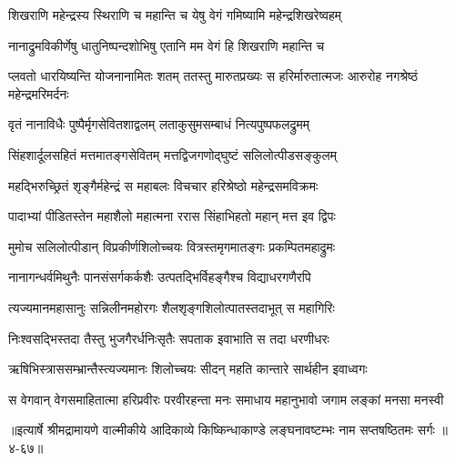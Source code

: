 \twolineshloka
{शिखराणि महेन्द्रस्य स्थिराणि च महान्ति च}
{येषु वेगं गमिष्यामि महेन्द्रशिखरेष्वहम्} %

\twolineshloka
{नानाद्रुमविकीर्णेषु धातुनिष्पन्दशोभिषु}
{एतानि मम वेगं हि शिखराणि महान्ति च} %

\threelineshloka
{प्लवतो धारयिष्यन्ति योजनानामितः शतम्}
{ततस्तु मारुतप्रख्यः स हरिर्मारुतात्मजः}
{आरुरोह नगश्रेष्ठं महेन्द्रमरिमर्दनः} %

\twolineshloka
{वृतं नानाविधैः पुष्पैर्मृगसेवितशाद्वलम्}
{लताकुसुमसम्बाधं नित्यपुष्पफलद्रुमम्} %

\twolineshloka
{सिंहशार्दूलसहितं मत्तमातङ्गसेवितम्}
{मत्तद्विजगणोद्घुष्टं सलिलोत्पीडसङ्कुलम्} %

\twolineshloka
{महद्भिरुच्छ्रितं शृङ्गैर्महेन्द्रं स महाबलः}
{विचचार हरिश्रेष्ठो महेन्द्रसमविक्रमः} %

\twolineshloka
{पादाभ्यां पीडितस्तेन महाशैलो महात्मना}
{ररास सिंहाभिहतो महान् मत्त इव द्विपः} %

\twolineshloka
{मुमोच सलिलोत्पीडान् विप्रकीर्णशिलोच्चयः}
{वित्रस्तमृगमातङ्गः प्रकम्पितमहाद्रुमः} %

\twolineshloka
{नानागन्धर्वमिथुनैः पानसंसर्गकर्कशैः}
{उत्पतद्भिर्विहङ्गैश्च विद्याधरगणैरपि} %

\twolineshloka
{त्यज्यमानमहासानुः सन्निलीनमहोरगः}
{शैलशृङ्गशिलोत्पातस्तदाभूत् स महागिरिः} %

\twolineshloka
{निःश्वसद्भिस्तदा तैस्तु भुजगैरर्धनिःसृतैः}
{सपताक इवाभाति स तदा धरणीधरः} %

\twolineshloka
{ऋषिभिस्त्राससम्भ्रान्तैस्त्यज्यमानः शिलोच्चयः}
{सीदन् महति कान्तारे सार्थहीन इवाध्वगः} %

\twolineshloka
{स वेगवान् वेगसमाहितात्मा हरिप्रवीरः परवीरहन्ता}
{मनः समाधाय महानुभावो जगाम लङ्कां मनसा मनस्वी} %


॥इत्यार्षे श्रीमद्रामायणे वाल्मीकीये आदिकाव्ये किष्किन्धाकाण्डे लङ्घनावष्टम्भः नाम सप्तषष्ठितमः सर्गः ॥४-६७॥
